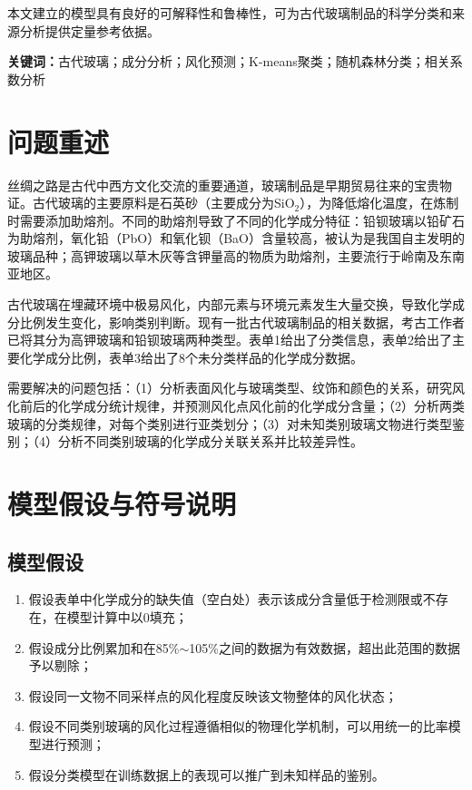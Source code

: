 \documentclass[12pt,a4paper]{ctexart}
\begin{document}
本文建立的模型具有良好的可解释性和鲁棒性，可为古代玻璃制品的科学分类和来源分析提供定量参考依据。

\vspace{1em}
\begin{center}
\textbf{关键词：}古代玻璃；成分分析；风化预测；K-means聚类；随机森林分类；相关系数分析
\end{center}

\newpage
\setcounter{page}{1}

\section{问题重述}

丝绸之路是古代中西方文化交流的重要通道，玻璃制品是早期贸易往来的宝贵物证。古代玻璃的主要原料是石英砂（主要成分为SiO$_2$），为降低熔化温度，在炼制时需要添加助熔剂。不同的助熔剂导致了不同的化学成分特征：铅钡玻璃以铅矿石为助熔剂，氧化铅（PbO）和氧化钡（BaO）含量较高，被认为是我国自主发明的玻璃品种；高钾玻璃以草木灰等含钾量高的物质为助熔剂，主要流行于岭南及东南亚地区。

古代玻璃在埋藏环境中极易风化，内部元素与环境元素发生大量交换，导致化学成分比例发生变化，影响类别判断。现有一批古代玻璃制品的相关数据，考古工作者已将其分为高钾玻璃和铅钡玻璃两种类型。表单1给出了分类信息，表单2给出了主要化学成分比例，表单3给出了8个未分类样品的化学成分数据。

需要解决的问题包括：（1）分析表面风化与玻璃类型、纹饰和颜色的关系，研究风化前后的化学成分统计规律，并预测风化点风化前的化学成分含量；（2）分析两类玻璃的分类规律，对每个类别进行亚类划分；（3）对未知类别玻璃文物进行类型鉴别；（4）分析不同类别玻璃的化学成分关联关系并比较差异性。

\section{模型假设与符号说明}

\subsection{模型假设}

\begin{enumerate}[label=(\arabic*)]
    \item 假设表单中化学成分的缺失值（空白处）表示该成分含量低于检测限或不存在，在模型计算中以0填充；
    \item 假设成分比例累加和在85\%$\sim$105\%之间的数据为有效数据，超出此范围的数据予以剔除；
    \item 假设同一文物不同采样点的风化程度反映该文物整体的风化状态；
    \item 假设不同类别玻璃的风化过程遵循相似的物理化学机制，可以用统一的比率模型进行预测；
    \item 假设分类模型在训练数据上的表现可以推广到未知样品的鉴别。
\end{enumerate}
\end{document}
